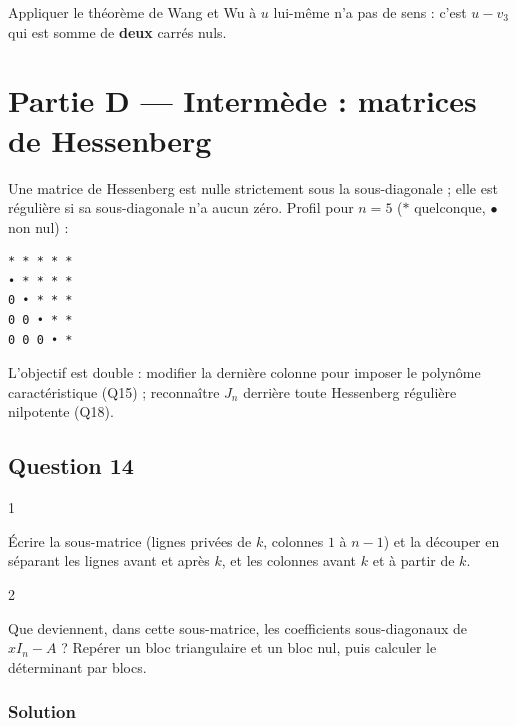 \documentclass[11pt,a4paper]{article}
\begin{document}
\begin{piege}

Appliquer le théorème de Wang et Wu à \(u\) lui-même n'a pas de sens : c'est \(u-v_3\) qui est somme de \textbf{deux} carrés nuls.

\end{piege}

\hypertarget{partie-d-intermuxe8de-matrices-de-hessenberg}{%
\section{Partie D --- Intermède : matrices de Hessenberg}\label{partie-d-intermuxe8de-matrices-de-hessenberg}}

Une matrice de Hessenberg est nulle strictement sous la sous-diagonale ; elle est régulière si sa sous-diagonale n'a aucun zéro. Profil pour \(n=5\) (\(\ast\) quelconque, \(\bullet\) non nul) :

\begin{lstlisting}
* * * * *
• * * * *
0 • * * *
0 0 • * *
0 0 0 • *
\end{lstlisting}

L'objectif est double : modifier la dernière colonne pour imposer le polynôme caractéristique (Q15) ; reconnaître \(J_n\) derrière toute Hessenberg régulière nilpotente (Q18).

\hypertarget{question-14}{%
\subsection{Question 14}\label{question-14}}

\begin{indication}{1}

Écrire la sous-matrice (lignes privées de \(k\), colonnes \(1\) à \(n-1\)) et la découper en séparant les lignes avant et après \(k\), et les colonnes avant \(k\) et à partir de \(k\).

\end{indication}

\begin{indication}{2}

Que deviennent, dans cette sous-matrice, les coefficients sous-diagonaux de \(xI_n-A\) ? Repérer un bloc triangulaire et un bloc nul, puis calculer le déterminant par blocs.

\end{indication}

\hypertarget{solution-13}{%
\subsubsection{Solution}\label{solution-13}}
\end{document}

